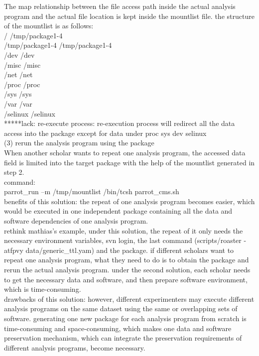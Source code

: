 \documentclass{article}
\begin{document}
The map relationship between the file access path inside the actual analysis program and the actual file location is kept inside the mountlist file. the structure of the mountlist is as follows:\\
\indent / /tmp/package1-4 \\
\indent /tmp/package1-4 /tmp/package1-4 \\
\indent /dev /dev \\
\indent /misc /misc \\
\indent /net /net \\
\indent /proc /proc \\
\indent /sys /sys \\
\indent /var /var \\
\indent /selinux /selinux\\

*****lack: re-execute process: re-execution process will redirect all the data access into the package except for data under proc sys dev selinux\\

(3) rerun the analysis program using the package\\
\indent When another scholar wants to repeat one analysis program, the accessed data field is limited into the target package with the help of the mountlist generated in step 2. \\

command:\\
\indent parrot\_run –m /tmp/mountlist /bin/tcsh parrot\_cms.sh\\

benefits of this solution: the repeat of one analysis program becomes easier, which would be executed in one independent package containing all the data and software dependencies of one analysis program. \\

rethink mathias’s example, under this solution, the repeat of it only needs the necessary environment variables, svn login,  the last command (scripts/roaster -atfpvy data/generic\_ttl.yam) and the package. if different scholars want to repeat one analysis program, what they need to do is to obtain the package and rerun the actual analysis program. under the second solution, each scholar needs to get the necessary data and software, and then prepare software environment, which is time-consuming. \\

drawbacks of this solution: however, different experimenters may execute different analysis programs on the same dataset using the same or overlapping sets of software. generating one new package for each analysis program from scratch is time-consuming and space-consuming, which makes one data and software preservation mechanism, which can integrate the preservation requirements of different analysis programs, become necessary. 
\end{document}
